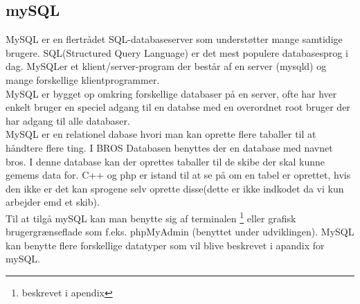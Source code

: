 \subsection{mySQL}
MySQL er en flertrådet SQL-databaseserver som understøtter mange samtidige brugere. SQL(Structured Query Language) er det mest populere databasesprog i dag. MySQLer et klient/server-program der består af en server (mysqld) og mange forskellige klientprogrammer.\\
MySQL er bygget op omkring forskellige databaser på en server, ofte har hver enkelt bruger en speciel adgang til en databse med en overordnet root bruger der har adgang til alle databaser.\\
MySQL er en relationel dabase hvori man kan oprette flere taballer til at håndtere flere ting. I BROS Databasen benyttes der en database med navnet bros. I denne database kan der oprettes taballer til de skibe der skal kunne gemems data for. C++ og php er istand til at se på om en tabel er oprettet, hvis den ikke er det kan sprogene selv oprette disse(dette er ikke indkodet da vi kun arbejder emd et skib). \\
Til at tilgå mySQL kan man benytte sig af terminalen \footnote{beskrevet i apendix} eller grafisk brugergrænseflade som f.eks. phpMyAdmin (benyttet under udviklingen).
MySQL kan benytte flere forskellige datatyper som vil blive beskrevet i apandix for mySQL. 






